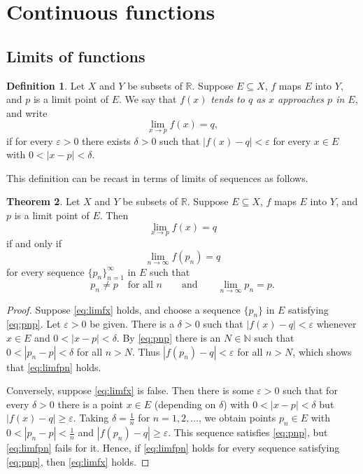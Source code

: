 \documentclass[11pt,a4paper]{article}
\numberwithin{equation}{section}
\theoremstyle{definition}
\newtheorem{thm}{Theorem}[subsection]
\newtheorem{defn}[thm]{Definition}
\begin{document}
\section{Continuous functions}


\subsection{Limits of functions}

\begin{defn}
Let $X$ and $Y$ be subsets of $\mathbb{R}$. Suppose $E\subseteq X$, $f$ maps $E$ into $Y$, and $p$ is a limit point of $E$. We say that $f(x)$ \emph{tends to $q$ as $x$ approaches $p$ in $E$}, and write
$$\lim_{x\rightarrow p} f(x) = q,$$
if for every $\varepsilon >0$ there exists $\delta > 0$ such that $|f(x)  - q| < \varepsilon$ for every $x \in E$ with $0 < |x - p| < \delta$.
\end{defn}

This definition can be recast in terms of limits of sequences as follows.


\begin{thm}
Let $X$ and $Y$ be subsets of $\mathbb{R}$. Suppose $E\subseteq X$, $f$ maps $E$ into $Y$, and $p$ is a limit point of $E$. Then
\begin{equation}\label{eq:limfx}
\lim_{x\rightarrow p} f(x) = q
\end{equation}
if and only if
\begin{equation}\label{eq:limfpn}
\lim_{n\rightarrow \infty} f(p_n) = q
\end{equation}
for every sequence $\{p_n\}^{\infty}_{n = 1}$ in $E$ such that
\begin{equation}\label{eq:pnp}
p_n \neq p \quad\text{for all } n \qquad\text{and}\qquad \lim_{n\rightarrow \infty} p_n = p.
\end{equation}
\end{thm}

\begin{proof}
Suppose \eqref{eq:limfx} holds, and choose a sequence $\{p_n\}$ in $E$ satisfying \eqref{eq:pnp}. Let $\varepsilon > 0$ be given. There is a $\delta > 0$ such that $|f(x) - q| < \varepsilon$ whenever $x \in E$ and $0 < |x - p| < \delta$. By \eqref{eq:pnp} there is an $N \in \mathbb{N}$ such that $0 <|p_n - p| < \delta$ for all $n > N$. Thus $|f(p_n) - q| < \varepsilon$ for all $n > N$, which shows that \eqref{eq:limfpn} holds.

Conversely, suppose \eqref{eq:limfx} is false. Then there is some $\varepsilon > 0$ such that for every $\delta > 0$ there is a point $x \in E$ (depending on $\delta$) with $0 < |x - p| < \delta$ but $|f(x) - q|\geq \varepsilon$. Taking $\delta = \frac{1}{n}$ for $n = 1, 2, \dots$, we obtain points $p_n\in E$ with $0<|p_n - p|<\frac{1}{n}$ and $|f(p_n)-q|\geq\varepsilon$. This sequence satisfies \eqref{eq:pnp}, but \eqref{eq:limfpn} fails for it. Hence, if \eqref{eq:limfpn} holds for every sequence satisfying \eqref{eq:pnp}, then \eqref{eq:limfx} holds.
\end{proof}
\end{document}
